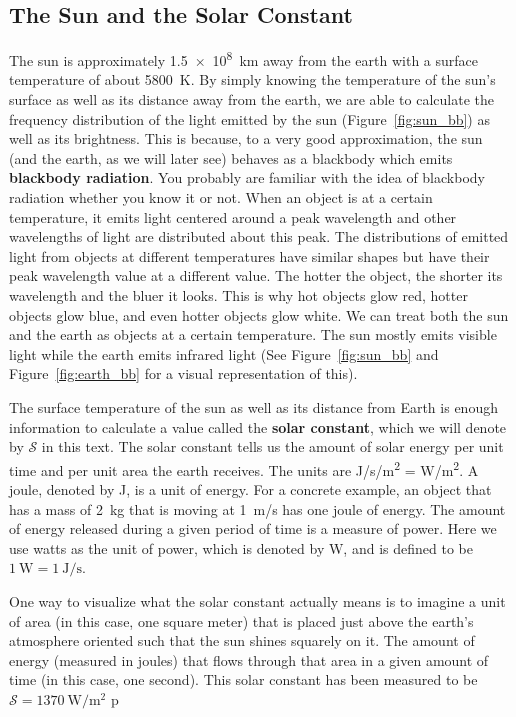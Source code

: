         \subsection{The Sun and the Solar Constant} %
        \label{sub:the_sun}
        
        The sun is approximately \SI{1.5e8}{\km} away from the earth with a surface temperature of about \SI{5800}{\kelvin}. By simply knowing the temperature of the sun's surface as well as its distance away from the earth, we are able to calculate the frequency distribution of the light emitted by the sun (Figure~\ref{fig:sun_bb}) as well as its brightness. This is because, to a very good approximation, the sun (and the earth, as we will later see) behaves as a blackbody which emits \textbf{blackbody radiation}. You probably are familiar with the idea of blackbody radiation whether you know it or not. When an object is at a certain temperature, it emits light centered around a peak wavelength and other wavelengths of light are distributed about this peak. The distributions of emitted light from objects at different temperatures have similar shapes but have their peak wavelength value at a different value. The hotter the object, the shorter its wavelength and the bluer it looks. This is why hot objects glow red, hotter objects glow blue, and even hotter objects glow white. We can treat both the sun and the earth as objects at a certain temperature. The sun mostly emits visible light while the earth emits infrared light (See Figure~\ref{fig:sun_bb} and Figure~\ref{fig:earth_bb} for a visual representation of this).

        The surface temperature of the sun as well as its distance from Earth is enough information to calculate a value called the \textbf{solar constant}, which we will denote by $\mathcal{S}$ in this text. The solar constant tells us the amount of solar energy per unit time and per unit area the earth receives. The units are \si{\joule/\second/\meter^{2}} = \si{\watt/\meter^{2}}. A joule, denoted by \si{\joule}, is a unit of energy. For a concrete example, an object that has a mass of \SI{2}{\kg} that is moving at \SI{1}{\m/\s} has one joule of energy. The amount of energy released during a given period of time is a measure of power. Here we use watts as the unit of power, which is denoted by \si{\watt}, and is defined to be $\SI{1}{\watt} = \SI{1}{\joule/\s}$. 

        One way to visualize what the solar constant actually means is to imagine a unit of area (in this case, one square meter) that is placed just above the earth's atmosphere oriented such that the sun shines squarely on it. The amount of energy (measured in joules) that flows through that area in a given amount of time (in this case, one second). This solar constant has been measured to be $\mathcal{S} = \SI{1370}{\watt/\m^2}$ \citep{schroeder1999introduction,thorndike1976energy}p

